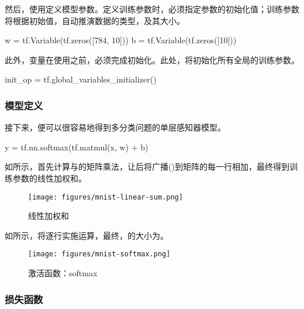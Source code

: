 \begin{content}
然后，使用定义模型参数。定义训练参数时，必须指定参数的初始化值；训练参数将根据初始值，自动推演数据的类型，及其大小。

\begin{leftbar}
\begin{python}
w = tf.Variable(tf.zeros([784, 10]))
b = tf.Variable(tf.zeros([10]))
\end{python}
\end{leftbar}

此外，变量在使用之前，必须完成初始化。此处，将初始化所有全局的训练参数。

\begin{leftbar}
\begin{python}
init_op = tf.global_variables_initializer()
\end{python}
\end{leftbar}

\subsubsection{模型定义}

接下来，便可以很容易地得到多分类问题的单层感知器模型。

\begin{leftbar}
\begin{python}
y = tf.nn.softmax(tf.matmul(x, w) + b)
\end{python}
\end{leftbar}

如所示，首先计算与的矩阵乘法，让后将广播()到矩阵的每一行相加，最终得到训练参数的线性加权和。

\begin{figure}[H]
\centering
\texttt{[image: figures/mnist-linear-sum.png]}
\caption{线性加权和}
 \label{fig:mnist-linear-sum}
\end{figure}

如所示，将逐行实施运算，最终，的大小为\code{[100, 10]}。

\begin{figure}[H]
\centering
\texttt{[image: figures/mnist-softmax.png]}
\caption{激活函数：softmax}
 \label{fig:mnist-softmax}
\end{figure}

\subsubsection{损失函数}


\end{content}
